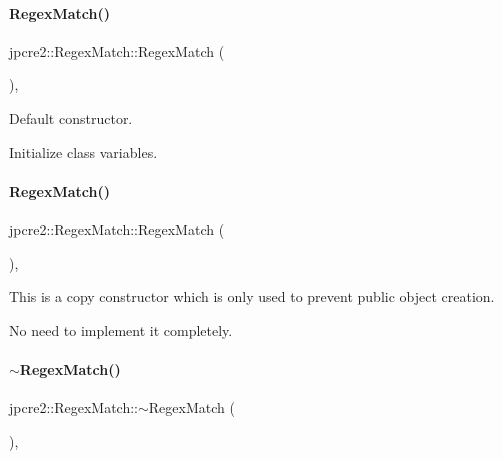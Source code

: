 \paragraph{\texorpdfstring{Regex\+Match()}{RegexMatch()}\hspace{0.1cm}{\footnotesize\ttfamily [1/2]}}
{\footnotesize\ttfamily jpcre2\+::\+Regex\+Match\+::\+Regex\+Match (\begin{DoxyParamCaption}{ }\end{DoxyParamCaption})\hspace{0.3cm}{\ttfamily [inline]}, {\ttfamily [private]}}



Default constructor. 

Initialize class variables. \hypertarget{classjpcre2_1_1RegexMatch_a098ddb46b2f297870ea548ef07597d94_a098ddb46b2f297870ea548ef07597d94}{}\label{classjpcre2_1_1RegexMatch_a098ddb46b2f297870ea548ef07597d94_a098ddb46b2f297870ea548ef07597d94} 
\paragraph{\texorpdfstring{Regex\+Match()}{RegexMatch()}\hspace{0.1cm}{\footnotesize\ttfamily [2/2]}}
{\footnotesize\ttfamily jpcre2\+::\+Regex\+Match\+::\+Regex\+Match (\begin{DoxyParamCaption}\item[{const \hyperlink{classjpcre2_1_1RegexMatch}{Regex\+Match} \&}]{ }\end{DoxyParamCaption})\hspace{0.3cm}{\ttfamily [inline]}, {\ttfamily [private]}}



This is a copy constructor which is only used to prevent public object creation. 

No need to implement it completely. \hypertarget{classjpcre2_1_1RegexMatch_ab6a9f9b8404852e46edd08a5b8712847_ab6a9f9b8404852e46edd08a5b8712847}{}\label{classjpcre2_1_1RegexMatch_ab6a9f9b8404852e46edd08a5b8712847_ab6a9f9b8404852e46edd08a5b8712847} 
\paragraph{\texorpdfstring{$\sim$\+Regex\+Match()}{~RegexMatch()}}
{\footnotesize\ttfamily jpcre2\+::\+Regex\+Match\+::$\sim$\+Regex\+Match (\begin{DoxyParamCaption}{ }\end{DoxyParamCaption})\hspace{0.3cm}{\ttfamily [inline]}, {\ttfamily [private]}}



